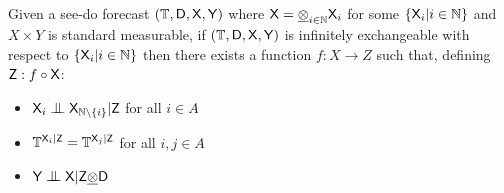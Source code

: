 \begin{lemma}\label{lem:rep_seedo_obs}
Given a see-do forecast $(\mathbb{T},\mathsf{D},\mathsf{X},\mathsf{Y})$ where $\mathsf{X}=\underline{\otimes}_{i\in \mathbb{N}} \mathsf{X}_i$ for some $\{\mathsf{X}_i|i\in \mathbb{N}\}$ and $X\times Y$ is standard measurable, if $(\mathbb{T},\mathsf{D},\mathsf{X},\mathsf{Y})$ is infinitely exchangeable with respect to $\{\mathsf{X}_i|i\in \mathbb{N}\}$ then there exists a function $f:X\to Z$ such that, defining $\mathsf{Z}:f\circ \mathsf{X}$:
\begin{itemize}
    \item $\RV{X}_i\CI\RV{X}_{\mathbb{N}\setminus\{i\}}|\RV{Z}$ for all $i\in A$
    \item $\mathbb{T}^{\mathsf{X}_i|\mathsf{Z}}=\mathbb{T}^{\mathsf{X}_j|\mathsf{Z}}$ for all $i,j\in A$
    \item $\RV{Y}\CI\RV{X}|\RV{Z}\utimes \RV{D}$
\end{itemize}
\end{lemma}


